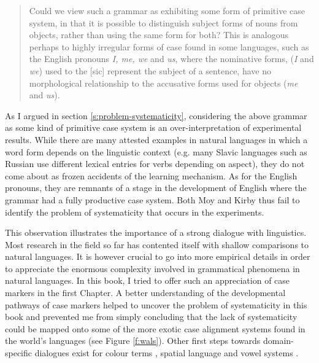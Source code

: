 \begin{quote}
Could we view such a grammar as exhibiting some form of primitive case system, in that it is possible to distinguish subject forms of nouns from objects, rather than using the same form for both? This is analogous perhaps to highly irregular forms of case found in some languages, such as the English pronouns {\em I, me, we} and {\em us}, where the nominative forms, ({\em I} and {\em we}) used to the [sic] represent the subject of a sentence, have no morphological relationship to the accusative forms used for objects ({\em me} and {\em us}). \citep[p. 114]{moy06case}
\end{quote}

 As I argued in section \ref{s:problem-systematicity}, considering the above grammar as some kind of primitive case system is an over-interpretation of experimental results. While there are many attested examples in natural languages in which a word form depends on the linguistic context (e.g. many Slavic languages such as Russian use different lexical entries for verbs depending on aspect), they do not come about as frozen accidents of the learning mechanism. As for the English pronouns, they are remnants of a stage in the development of English where the grammar had a fully productive case system. Both Moy and Kirby thus fail to identify the problem of systematicity that occurs in the experiments.

This observation illustrates the importance of a strong dialogue with linguistics. Most research in the field so far has contented itself with shallow comparisons to natural languages. It is however crucial to go into more empirical details in order to appreciate the enormous complexity involved in grammatical phenomena in natural languages. In this book, I tried to offer such an appreciation of case markers in the first Chapter. A better understanding of the developmental pathways of case markers helped to uncover the problem of systematicity in this book and prevented me from simply concluding that the lack of systematicity could be mapped onto some of the more exotic case alignment systems found in the world's languages (see Figure \ref{f:wals}). Other first steps towards domain-specific dialogues exist for colour terms \citep{steels05coordinating}, spatial language \citep{loetzsch08typological} and vowel systems \citep{deboer99self}.

